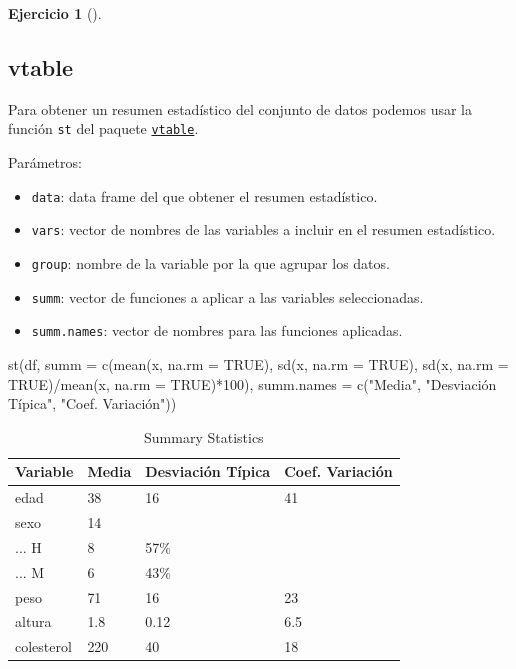 \documentclass[
  spanish,
  a4paper,
]{scrreport}
\newenvironment{Shaded}{\begin{snugshade}}{\end{snugshade}}
\newcommand{\AttributeTok}[1]{\textcolor[rgb]{0.40,0.45,0.13}{#1}}
\newcommand{\FunctionTok}[1]{\textcolor[rgb]{0.28,0.35,0.67}{#1}}
\newcommand{\NormalTok}[1]{\textcolor[rgb]{0.00,0.23,0.31}{#1}}
\newcommand{\StringTok}[1]{\textcolor[rgb]{0.13,0.47,0.30}{#1}}
\providecommand{\tightlist}{%
  \setlength{\itemsep}{0pt}\setlength{\parskip}{0pt}}
\theoremstyle{definition}
\newtheorem{exercise}{Ejercicio}[chapter]
\theoremstyle{remark}
\begin{document}
\begin{exercise}[]
\begin{enumerate}
\begin{tcolorbox}
  \section{vtable}

  Para obtener un resumen estadístico del conjunto de datos podemos usar
  la función \texttt{st} del paquete
  \href{https://cran.r-project.org/web/packages/vtable/vignettes/sumtable.html}{\texttt{vtable}}.

  Parámetros:

  \begin{itemize}
  \tightlist
  \item
    \texttt{data}: data frame del que obtener el resumen estadístico.
  \item
    \texttt{vars}: vector de nombres de las variables a incluir en el
    resumen estadístico.
  \item
    \texttt{group}: nombre de la variable por la que agrupar los datos.
  \item
    \texttt{summ}: vector de funciones a aplicar a las variables
    seleccionadas.
  \item
    \texttt{summ.names}: vector de nombres para las funciones aplicadas.
  \end{itemize}

\begin{Shaded}
\begin{Highlighting}[]
\FunctionTok{st}\NormalTok{(df, }\AttributeTok{summ =} \FunctionTok{c}\NormalTok{(}\StringTok{\textquotesingle{}mean(x, na.rm = TRUE)\textquotesingle{}}\NormalTok{, }\StringTok{\textquotesingle{}sd(x, na.rm = TRUE)\textquotesingle{}}\NormalTok{, }\StringTok{\textquotesingle{}sd(x, na.rm = TRUE)/mean(x, na.rm = TRUE)*100\textquotesingle{}}\NormalTok{),}
\AttributeTok{summ.names =} \FunctionTok{c}\NormalTok{(}\StringTok{"Media"}\NormalTok{, }\StringTok{"Desviación Típica"}\NormalTok{, }\StringTok{"Coef. Variación"}\NormalTok{))}
\end{Highlighting}
\end{Shaded}

  \begin{table}

  \caption{\label{tab:unnamed-chunk-49}Summary Statistics}
  \centering
  \begin{tabular}[t]{llll}
  \toprule
  Variable & Media & Desviación Típica & Coef. Variación\\
  \midrule
  edad & 38 & 16 & 41\\
  sexo & 14 &  & \\
  ... H & 8 & 57\% & \\
  ... M & 6 & 43\% & \\
  peso & 71 & 16 & 23\\
  \addlinespace
  altura & 1.8 & 0.12 & 6.5\\
  colesterol & 220 & 40 & 18\\
  \bottomrule
  \end{tabular}
  \end{table}


\end{tcolorbox}
\end{enumerate}
\end{exercise}
\end{document}
